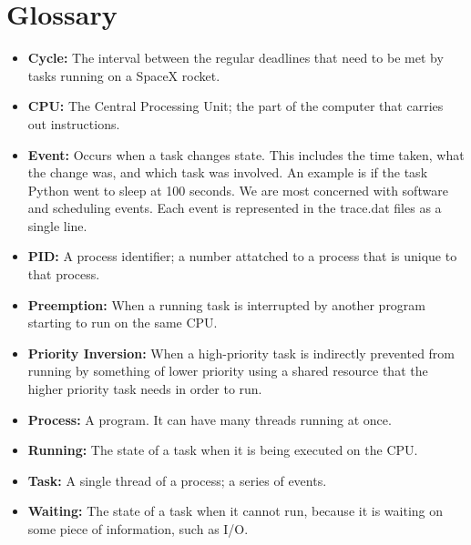 \documentclass{hmcclinic}
\begin{document}
\chapter{Glossary}
\begin{itemize}[ ]
\item {\bf Cycle:} The interval between the regular deadlines that need to be
  met by tasks running on a SpaceX rocket.
\item {\bf CPU:} The Central Processing Unit; the part of the computer that carries out instructions.
\item{\bf Event:} Occurs when a task changes state. This includes the time taken, what the
  change was, and which task was involved. An example is if the task Python went
  to sleep at 100 seconds. We are most concerned with software and scheduling
  events. Each event is represented in the trace.dat files as a single line.
\item {\bf PID:} A process identifier; a number attatched to a process that is unique to that process.
\item {\bf Preemption:} When a running task is interrupted by another program starting to run on the same CPU. 
\item {\bf Priority Inversion:} When a high-priority task is indirectly
  prevented from running by something of
lower priority using a shared resource that the higher priority task needs in
order to run. 
\item{\bf Process:} A program. It can have many threads running at once.
\item {\bf Running:} The state of a task when it is being executed on the CPU.
\item {\bf Task:} A single thread of a process; a series of events.
\item {\bf Waiting:} The state of a task when it cannot run, because it is waiting 
  on some piece of information, such as I/O.
\end{itemize}
\end{document}

